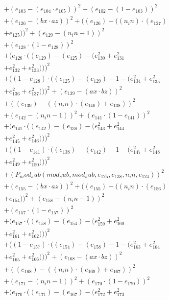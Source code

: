 \documentclass[10pt, a4paper]{article}
\begin{document}
\begin{small}
\begin{align*}
& + (e_{103} - (e_{104}  \cdot  e_{105}))^{2} + (e_{102} - (1 - e_{103}))^{2} \\
& + (e_{126} - (bx  \cdot  az))^{2} + ((e_{126}) - ((n_in)  \cdot  (e_{127}) \\
& + e_{125}))^{2} + (e_{129} - (n_in - 1))^{2} \\
& + (e_{128}  \cdot  (1 - e_{128}))^{2} \\
& + (e_{128}  \cdot  ((e_{129}) - (e_{125}) - (e_{130}^{2} + e_{131}^{2} \\
& + e_{132}^{2} + e_{133}^{2})))^{2} \\
& + ((1 - e_{128})  \cdot  ((e_{125}) - (e_{129}) - 1 - (e_{134}^{2} + e_{135}^{2} \\
& + e_{136}^{2} + e_{137}^{2})))^{2} + (e_{139} - (ax  \cdot  bz))^{2} \\
& + ((e_{139}) - ((n_in)  \cdot  (e_{140}) + e_{138}))^{2} \\
& + (e_{142} - (n_in - 1))^{2} + (e_{141}  \cdot  (1 - e_{141}))^{2} \\
& + (e_{141}  \cdot  ((e_{142}) - (e_{138}) - (e_{143}^{2} + e_{144}^{2} \\
& + e_{145}^{2} + e_{146}^{2})))^{2} \\
& + ((1 - e_{141})  \cdot  ((e_{138}) - (e_{142}) - 1 - (e_{147}^{2} + e_{148}^{2} \\
& + e_{149}^{2} + e_{150}^{2})))^{2} \\
& + (P_mod_sub(mod_sub, mod_sub, e_{125}, e_{138}, n_in, e_{124}))^{2} \\
& + (e_{155} - (bx  \cdot  az))^{2} + ((e_{155}) - ((n_in)  \cdot  (e_{156}) \\
& + e_{154}))^{2} + (e_{158} - (n_in - 1))^{2} \\
& + (e_{157}  \cdot  (1 - e_{157}))^{2} \\
& + (e_{157}  \cdot  ((e_{158}) - (e_{154}) - (e_{159}^{2} + e_{160}^{2} \\
& + e_{161}^{2} + e_{162}^{2})))^{2} \\
& + ((1 - e_{157})  \cdot  ((e_{154}) - (e_{158}) - 1 - (e_{163}^{2} + e_{164}^{2} \\
& + e_{165}^{2} + e_{166}^{2})))^{2} + (e_{168} - (ax  \cdot  bz))^{2} \\
& + ((e_{168}) - ((n_in)  \cdot  (e_{169}) + e_{167}))^{2} \\
& + (e_{171} - (n_in - 1))^{2} + (e_{170}  \cdot  (1 - e_{170}))^{2} \\
& + (e_{170}  \cdot  ((e_{171}) - (e_{167}) - (e_{172}^{2} + e_{173}^{2} \\

\end{align*}
\end{small}
\end{document}
